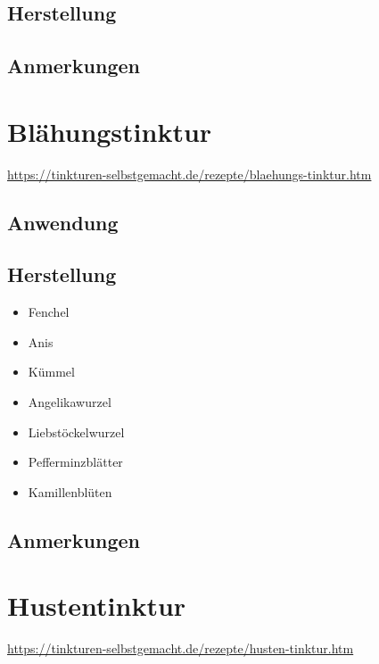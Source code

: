 \subsection{Herstellung}

\subsection{Anmerkungen}







\section{Blähungstinktur}

\cite{tinkturen}  

\url{https://tinkturen-selbstgemacht.de/rezepte/blaehungs-tinktur.htm}

\subsection{Anwendung}


\subsection{Herstellung}


\begin{itemize}
	\item Fenchel
	\item Anis
	\item Kümmel
	\item Angelikawurzel
	\item Liebstöckelwurzel
	\item Pefferminzblätter
	\item Kamillenblüten
\end{itemize}

\subsection{Anmerkungen}




\section{Hustentinktur}

\cite{tinkturen}  

\url{https://tinkturen-selbstgemacht.de/rezepte/husten-tinktur.htm} 


